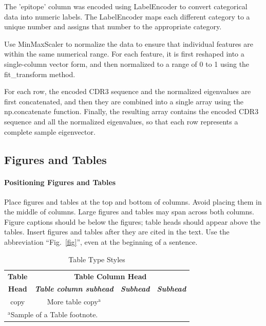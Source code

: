 \documentclass[conference]{IEEEtran}
\begin{document}
	The 'epitope' column was encoded using LabelEncoder to convert categorical data into numeric labels. The LabelEncoder maps each different category to a unique number and assigns that number to the appropriate category.
	
	Use MinMaxScaler to normalize the data to ensure that individual features are within the same numerical range. For each feature, it is first reshaped into a single-column vector form, and then normalized to a range of 0 to 1 using the fit\_transform method.
	
	For each row, the encoded CDR3 sequence and the normalized eigenvalues are first concatenated, and then they are combined into a single array using the np.concatenate function. Finally, the resulting array contains the encoded CDR3 sequence and all the normalized eigenvalues, so that each row represents a complete sample eigenvector.
	
	
	\subsection{Figures and Tables}
	\paragraph{Positioning Figures and Tables} Place figures and tables at the top and 
	bottom of columns. Avoid placing them in the middle of columns. Large 
	figures and tables may span across both columns. Figure captions should be 
	below the figures; table heads should appear above the tables. Insert 
	figures and tables after they are cited in the text. Use the abbreviation 
	``Fig.~\ref{fig}'', even at the beginning of a sentence.
	
	\begin{table}[htbp]
		\caption{Table Type Styles}
		\begin{center}
			\begin{tabular}{|c|c|c|c|}
				\hline
				\textbf{Table}&\multicolumn{3}{|c|}{\textbf{Table Column Head}} \\
				\cline{2-4} 
				\textbf{Head} & \textbf{\textit{Table column subhead}}& \textbf{\textit{Subhead}}& \textbf{\textit{Subhead}} \\
				\hline
				copy& More table copy$^{\mathrm{a}}$& &  \\
				\hline
				\multicolumn{4}{l}{$^{\mathrm{a}}$Sample of a Table footnote.}
			\end{tabular}
			\label{tab1}
		\end{center}
	\end{table}
	
\end{document}
